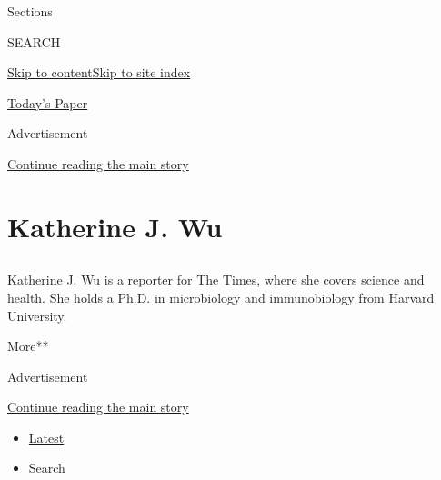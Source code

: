 Sections

SEARCH

\protect\hyperlink{site-content}{Skip to
content}\protect\hyperlink{site-index}{Skip to site index}

\href{https://myaccount.nytimes.com/auth/login?response_type=cookie\&client_id=vi}{}

\href{https://www.nytimes.com/section/todayspaper}{Today's Paper}

Advertisement

\protect\hyperlink{after-top}{Continue reading the main story}

\hypertarget{katherine-j-wu}{%
\section{Katherine J. Wu}\label{katherine-j-wu}}

\subsection{}

Katherine J. Wu is a reporter for The Times, where she covers science
and health. She holds a Ph.D. in microbiology and immunobiology from
Harvard University.

More**

Advertisement

\protect\hyperlink{after-mid1}{Continue reading the main story}

\begin{itemize}
\tightlist
\item
  \protect\hyperlink{stream-panel}{Latest}
\item
  Search
\end{itemize}

